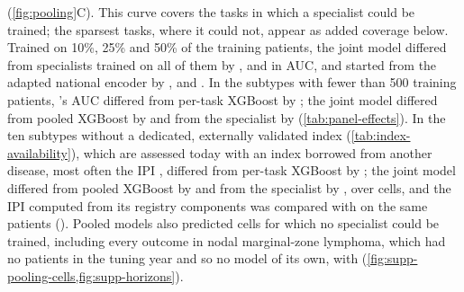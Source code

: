 (\cref{fig:pooling}C). This curve covers the tasks in which a specialist
could be trained; the sparsest tasks, where it could not, appear as added
coverage below. Trained on 10\%, 25\% and 50\% of the training patients, the joint
model differed from specialists trained on all of them by ,
 and  in AUC, and started from the
adapted national encoder by ,  and
. In the subtypes with fewer than 500 training patients,
\opera{}'s AUC differed from per-task XGBoost by
; the joint model differed from pooled XGBoost by
 and from the specialist by 
(\cref{tab:panel-effects}). In
the ten subtypes without a dedicated, externally validated index
(\cref{tab:index-availability}), which are assessed today with an index borrowed
from another disease, most often the IPI \citep{IPI1993}, \opera{} differed from
per-task XGBoost by ; the joint model differed from
pooled XGBoost by  and from the specialist by , over
 cells, and the IPI
computed from its registry components was compared with \opera{} on the same
patients  (). 
Pooled models also predicted  cells for which no specialist could
be trained, including every outcome in nodal marginal-zone lymphoma, which had
no patients in the tuning year and so no model of its own, with 
(\cref{fig:supp-pooling-cells,fig:supp-horizons}).

